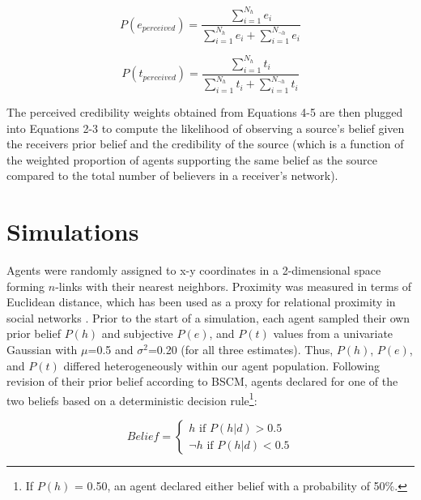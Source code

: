 \documentclass[doc,floatsintext]{apa6}
\begin{document}
\begin{equation}
    P(e_{perceived}) = \frac{\sum_{i=1}^{N_h}e_i}{\sum_{i=1}^{N_h}e_i + \sum_{i=1}^{N_{\neg h}}e_i}              
\end{equation}

\begin{equation}
    P(t_{perceived}) = \frac{\sum_{i=1}^{N_h}t_i}{\sum_{i=1}^{N_h}t_i + \sum_{i=1}^{N_{\neg h}}t_i}           
\end{equation}

The perceived credibility weights obtained from Equations 4-5 are then plugged into Equations 2-3 to compute the likelihood of observing a source's belief given the receivers prior belief and the credibility of the source (which is a function of the weighted proportion of agents supporting the same belief as the source compared to the total number of believers in a receiver's network).

\section{Simulations}
Agents were randomly assigned to x-y coordinates in a 2-dimensional space forming \(n\)-links with their nearest neighbors. Proximity was measured in terms of Euclidean distance, which has been used as a proxy for relational proximity in social networks \citep{duggins2017}. Prior to the start of a simulation, each agent sampled their own prior belief \(P(h)\) and subjective \(P(e)\), and \(P(t)\) values from a univariate Gaussian with \(\mu\)=0.5 and \(\sigma^2\)=0.20 (for all three estimates). Thus, \(P(h)\), \(P(e)\), and \(P(t)\) differed heterogeneously within our agent population. Following revision of their prior belief according to BSCM, agents declared for one of the two beliefs based on a deterministic decision rule\footnote{If \(P(h)\) = 0.50, an agent declared either belief with a probability of 50\%.}: 

\[
Belief = \begin{cases}
h \text{ if } P(h|d) > 0.5 \\
\neg h \text{ if } P(h|d) < 0.5 
\end{cases}
\]
\end{document}
